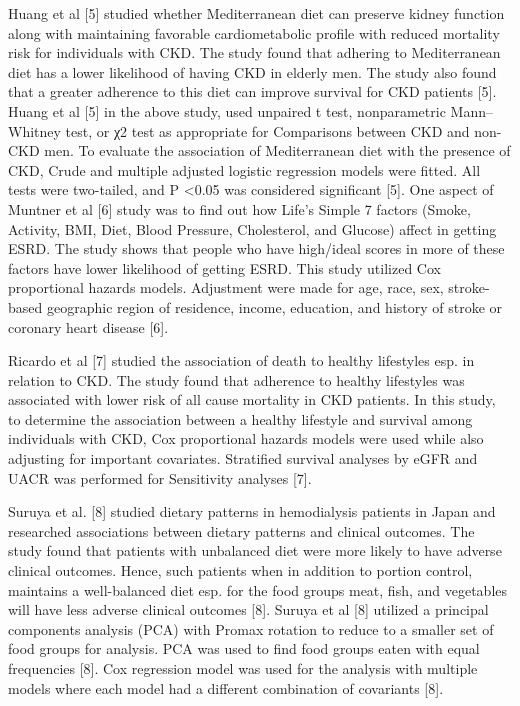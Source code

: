 Huang et al [5] studied whether Mediterranean diet can preserve kidney function along with maintaining favorable cardiometabolic profile with reduced mortality risk for individuals with CKD. The study found that adhering to Mediterranean diet has a lower likelihood of
having CKD in elderly men. The study also found that a greater adherence to this diet can improve survival for CKD patients [5]. Huang et al [5] in the above study, used unpaired t test, nonparametric Mann–Whitney test, or χ2 test as appropriate for Comparisons between CKD
and non-CKD men. To evaluate the association of Mediterranean diet with the presence of CKD, Crude and multiple adjusted logistic regression models were fitted. All tests were two-tailed, and P \textless 0.05 was considered significant [5]. One aspect of Muntner et al [6] study
was to find out how Life’s Simple 7 factors (Smoke, Activity, BMI, Diet, Blood Pressure, Cholesterol, and Glucose) affect in getting ESRD. The study shows that people who have high/ideal scores in more of these factors have lower likelihood of getting ESRD. This study
utilized Cox proportional hazards models. Adjustment were made for age, race, sex, stroke-based geographic region of residence, income, education, and history of stroke or coronary heart disease [6].

Ricardo et al [7] studied the association of death to healthy lifestyles esp. in relation to CKD. The study found that adherence to healthy lifestyles was associated with lower risk of all cause mortality in CKD patients. In this study, to determine the association between
a healthy lifestyle and survival among individuals with CKD, Cox proportional hazards models were used while also adjusting for important covariates. Stratified survival analyses by eGFR and UACR was performed for Sensitivity analyses [7].

Suruya et al. [8] studied dietary patterns in hemodialysis patients in Japan and researched associations between dietary patterns and clinical outcomes. The study found that patients with unbalanced diet were more likely to have adverse clinical outcomes. Hence, such
patients when in addition to portion control, maintains a well-balanced diet esp. for the food groups meat, fish, and vegetables will have less adverse clinical outcomes [8]. Suruya et al [8] utilized a principal components analysis (PCA) with Promax rotation to reduce to
a smaller set of food groups for analysis. PCA was used to find food groups eaten with equal frequencies [8]. Cox regression model was used for the analysis with multiple models where each model had a different combination of covariants [8].

